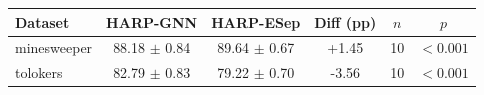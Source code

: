 \begin{tabular*}{\linewidth}{@{\extracolsep{\fill}}lccccc@{}}
\toprule
Dataset & HARP-GNN & HARP-ESep & Diff (pp) & $n$ & $p$ \\
\midrule
minesweeper & 88.18 $\pm$ 0.84 & 89.64 $\pm$ 0.67 & +1.45 & 10 & $<0.001$ \\
tolokers & 82.79 $\pm$ 0.83 & 79.22 $\pm$ 0.70 & -3.56 & 10 & $<0.001$ \\
\bottomrule
\end{tabular*}
